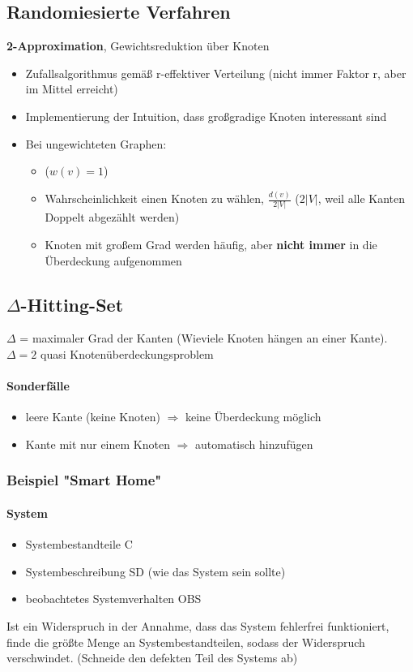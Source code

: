 \documentclass[ngerman]{scrartcl}
\begin{document}
\subsection{Randomiesierte Verfahren}
\textbf{2-Approximation}, Gewichtsreduktion über Knoten
\begin{itemize}
  \item Zufallsalgorithmus gemäß r-effektiver Verteilung (nicht immer Faktor r, aber im Mittel erreicht)
  \item Implementierung der Intuition, dass großgradige Knoten interessant sind
  \item Bei ungewichteten Graphen:
  \begin{itemize}
    \item ($ w(v) = 1 $)
    \item Wahrscheinlichkeit einen Knoten zu wählen, $ \frac{d(v)}{2|V|} $ ($ 2|V| $, weil alle Kanten Doppelt abgezählt werden)
    \item Knoten mit großem Grad werden häufig, aber \textbf{nicht immer} in die Überdeckung aufgenommen
  \end{itemize}
\end{itemize}

\subsection{$\Delta$-Hitting-Set}
$\Delta$ = maximaler Grad der Kanten (Wieviele Knoten hängen an einer Kante). $ \Delta = 2 $ quasi Knotenüberdeckungsproblem
\paragraph{Sonderfälle}
\begin{itemize}
  \item leere Kante (keine Knoten) $ \Rightarrow $ keine Überdeckung möglich
  \item Kante mit nur einem Knoten $ \Rightarrow $ automatisch hinzufügen
\end{itemize}
\subsubsection{Beispiel "Smart Home"}
\paragraph{System}
\begin{itemize}
  \item Systembestandteile C
  \item Systembeschreibung SD (wie das System sein sollte)
  \item beobachtetes Systemverhalten OBS
\end{itemize}
Ist ein Widerspruch in der Annahme, dass das System fehlerfrei funktioniert, finde die größte Menge an Systembestandteilen, sodass der Widerspruch verschwindet. (Schneide den defekten Teil des Systems ab)
\end{document}
